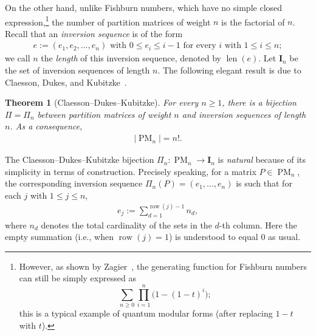 \documentclass[12pt,reqno]{amsart}
\numberwithin{equation}{section}
\theoremstyle{theorem}
\newtheorem{theorem}{Theorem}[section]
\theoremstyle{definition}
\theoremstyle{named}
\newcommand{\MatP}{\operatorname{PM}}
\newcommand{\row}{\operatorname{row}}
\newcommand{\bI}{\mathbf{I}}
\newcommand{\len}{\operatorname{len}}
\begin{document}
On the other hand, unlike Fishburn numbers, which have no simple closed expression,\footnote{However, as shown by Zagier~\cite[p.~948, Theorem~1]{Zag2001}, the generating function for Fishburn numbers can still be simply expressed as $$\sum_{n\ge 0} \prod_{i=1}^n \big(1-(1-t)^i\big);$$ this is a typical example of quantum modular forms (after replacing $1-t$ with $t$).} the number of partition matrices of weight $n$ is the factorial of $n$. Recall that an \emph{inversion sequence} is of the form
\begin{align*}
	\text{$e := (e_1,e_2,\ldots,e_n)$ with $0\le e_i \le i-1$ for every $i$ with $1\le i\le n$};
\end{align*}
we call $n$ the \emph{length} of this inversion sequence, denoted by $\len(e)$. Let $\bI_n$ be the set of inversion sequences of length $n$. The following elegant result is due to Claesson, Dukes, and Kubitzke~\cite[p.~1626, Theorem~3]{CDK2011}.

\begin{theorem}[Claesson--Dukes--Kubitzke]\label{th:CDK}
	For every $n\ge 1$, there is a bijection $\Pi = \Pi_n$ between partition matrices of weight $n$ and inversion sequences of length $n$. As a consequence,
	\begin{align*}
		|\MatP_n| = n!.
	\end{align*}
\end{theorem}

The Claesson--Dukes--Kubitzke bijection $\Pi_n:\MatP_n\to \bI_n$ is \emph{natural} because of its simplicity in terms of construction. Precisely speaking, for a matrix $P\in \MatP_{n}$, the corresponding inversion sequence $\Pi_n(P)=(e_1,\ldots,e_n)$ is such that for each $j$ with $1\le j\le n$,
\begin{align*}
	e_j := \sum_{d=1}^{\row(j)-1} n_d,
\end{align*}
where $n_d$ denotes the total cardinality of the sets in the $d$-th column. Here the empty summation (i.e., when $\row(j)=1$) is understood to equal $0$ as usual.
\end{document}

